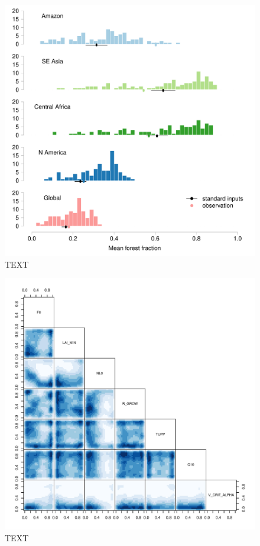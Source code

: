 \documentclass[esd, manuscript]{copernicus}
\begin{document}
\begin{figure}[t]
\includegraphics[width=12cm]{graphics/fraction_histogram_with_discrepancy_standard.pdf}
\caption{TEXT}
\label{fig:fraction_histogram_with_discrepancy_standard}
\end{figure}

\begin{figure}[t]
\includegraphics[width=12cm]{graphics/credible_NROY.pdf}
\caption{TEXT}
\label{fig:credible_NROY}
\end{figure}
\end{document}

